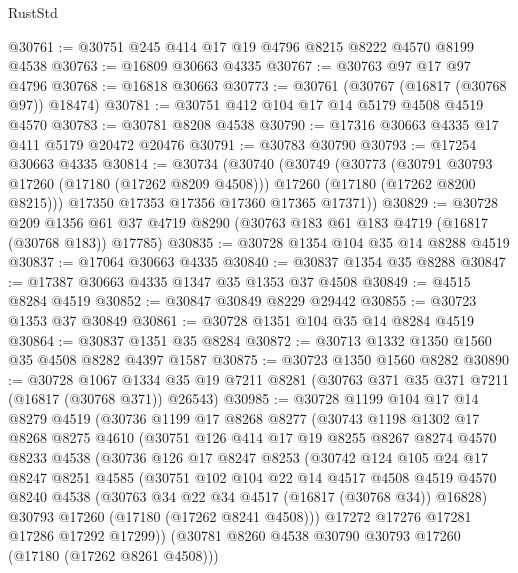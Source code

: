 \begin{lexlean}{RustStd}
\begin{coremodule}
{\begin{coremodule}
{{{{{{{{{{{{{{{{{{{{{{{{{{{{{{{{{{{{{{{{{{{{{{{{{{{{{{{@30761 := @30751 @245 @414 @17 @19 @4796 @8215 @8222 @4570 @8199 @4538
@30763 := @16809 @30663 @4335
@30767 := @30763 @97 @17 @97 @4796
@30768 := @16818 @30663
@30773 := @30761 (@30767 (@16817 (@30768 @97)) @18474)
@30781 := @30751 @412 @104 @17 @14 @5179 @4508 @4519 @4570
@30783 := @30781 @8208 @4538
@30790 := @17316 @30663 @4335 @17 @411 @5179 @20472 @20476
@30791 := @30783 @30790
@30793 := @17254 @30663 @4335
@30814 := @30734
    (@30740
      (@30749
        (@30773
          (@30791 @30793 @17260 (@17180 (@17262 @8209 @4508)))
          @17260
          (@17180 (@17262 @8200 @8215)))
        @17350
        @17353
        @17356
        @17360
        @17365
        @17371))
@30829 := @30728
    @209
    @1356
    @61
    @37
    @4719
    @8290
    (@30763 @183 @61 @183 @4719 (@16817 (@30768 @183)) @17785)
@30835 := @30728 @1354 @104 @35 @14 @8288 @4519
@30837 := @17064 @30663 @4335
@30840 := @30837 @1354 @35 @8288
@30847 := @17387 @30663 @4335 @1347 @35 @1353 @37 @4508
@30849 := @4515 @8284 @4519
@30852 := @30847 @30849 @8229 @29442
@30855 := @30723 @1353 @37 @30849
@30861 := @30728 @1351 @104 @35 @14 @8284 @4519
@30864 := @30837 @1351 @35 @8284
@30872 := @30713 @1332 @1350 @1560 @35 @4508 @8282 @4397 @1587
@30875 := @30723 @1350 @1560 @8282
@30890 := @30728
    @1067
    @1334
    @35
    @19
    @7211
    @8281
    (@30763 @371 @35 @371 @7211 (@16817 (@30768 @371)) @26543)
@30985 := @30728
    @1199
    @104
    @17
    @14
    @8279
    @4519
    (@30736
      @1199
      @17
      @8268
      @8277
      (@30743
        @1198
        @1302
        @17
        @8268
        @8275
        @4610
        (@30751
          @126
          @414
          @17
          @19
          @8255
          @8267
          @8274
          @4570
          @8233
          @4538
          (@30736
            @126
            @17
            @8247
            @8253
            (@30742
              @124
              @105
              @24
              @17
              @8247
              @8251
              @4585
              (@30751
                @102
                @104
                @22
                @14
                @4517
                @4508
                @4519
                @4570
                @8240
                @4538
                (@30763 @34 @22 @34 @4517 (@16817 (@30768 @34)) @16828)
                @30793
                @17260
                (@17180 (@17262 @8241 @4508)))
              @17272
              @17276
              @17281
              @17286
              @17292
              @17299))
          (@30781 @8260 @4538 @30790 @30793 @17260 (@17180 (@17262 @8261 @4508)))
}}}}}}}}}}}}}}}}}}}}}}}}}}}}}}}}}}}}}}}}}}}}}}}}}}}}}}}
\end{coremodule}}
\end{coremodule}
\end{lexlean}
